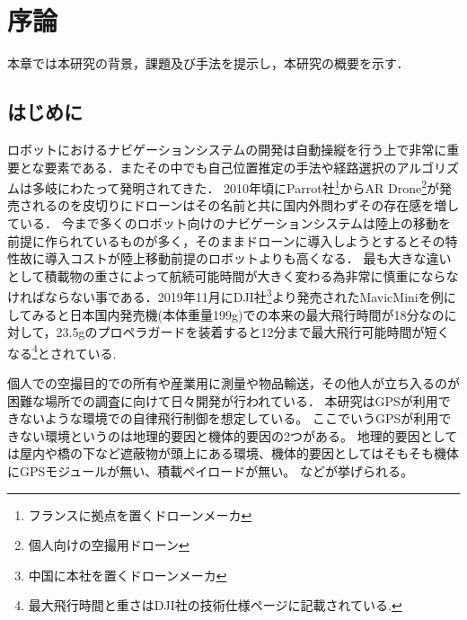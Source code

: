 \chapter{序論}
\label{introduction}

本章では本研究の背景，課題及び手法を提示し，本研究の概要を示す．

\section{はじめに}
\label{introduction:background}
ロボットにおけるナビゲーションシステムの開発は自動操縦を行う上で非常に重要とな要素である．またその中でも自己位置推定の手法や経路選択のアルゴリズムは多岐にわたって発明されてきた．
2010年頃にParrot社\footnote{フランスに拠点を置くドローンメーカ}からAR Drone\footnote{個人向けの空撮用ドローン}が発売されるのを皮切りにドローンはその名前と共に国内外問わずその存在感を増している．
今まで多くのロボット向けのナビゲーションシステムは陸上の移動を前提に作られているものが多く，そのままドローンに導入しようとするとその特性故に導入コストが陸上移動前提のロボットよりも高くなる．
最も大きな違いとして積載物の重さによって航続可能時間が大きく変わる為非常に慎重にならなければならない事である．2019年11月にDJI社\footnote{中国に本社を置くドローンメーカ}より発売されたMavicMiniを例にしてみると日本国内発売機(本体重量199g)での本来の最大飛行時間が18分なのに対して，23.5gのプロペラガードを装着すると12分まで最大飛行可能時間が短くなる\footnote{最大飛行時間と重さはDJI社の技術仕様ページに記載されている.}とされている.

 



個人での空撮目的での所有や産業用に測量や物品輸送，その他人が立ち入るのが困難な場所での調査に向けて日々開発が行われている．
本研究はGPSが利用できないような環境での自律飛行制御を想定している。
ここでいうGPSが利用できない環境というのは地理的要因と機体的要因の2つがある。
地理的要因としては屋内や橋の下など遮蔽物が頭上にある環境、機体的要因としてはそもそも機体にGPSモジュールが無い、積載ペイロードが無い。
などが挙げられる。

